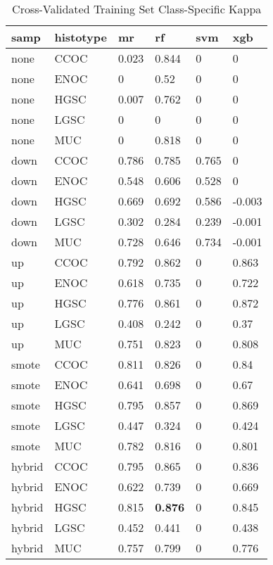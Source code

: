 \documentclass[
]{report}
\begin{document}
\begin{table}

\caption{\label{tab:train-kappa-class-table}Cross-Validated Training Set Class-Specific Kappa}
\centering
\begin{tabular}[t]{l|l|l|l|l|l}
\hline
samp & histotype & mr & rf & svm & xgb\\
\hline
none & CCOC & 0.023 & 0.844 & 0 & 0\\
\hline
none & ENOC & 0 & 0.52 & 0 & 0\\
\hline
none & HGSC & 0.007 & 0.762 & 0 & 0\\
\hline
none & LGSC & 0 & 0 & 0 & 0\\
\hline
none & MUC & 0 & 0.818 & 0 & 0\\
\hline
down & CCOC & 0.786 & 0.785 & 0.765 & 0\\
\hline
down & ENOC & 0.548 & 0.606 & 0.528 & 0\\
\hline
down & HGSC & 0.669 & 0.692 & 0.586 & -0.003\\
\hline
down & LGSC & 0.302 & 0.284 & 0.239 & -0.001\\
\hline
down & MUC & 0.728 & 0.646 & 0.734 & -0.001\\
\hline
up & CCOC & 0.792 & 0.862 & 0 & 0.863\\
\hline
up & ENOC & 0.618 & 0.735 & 0 & 0.722\\
\hline
up & HGSC & 0.776 & 0.861 & 0 & 0.872\\
\hline
up & LGSC & 0.408 & 0.242 & 0 & 0.37\\
\hline
up & MUC & 0.751 & 0.823 & 0 & 0.808\\
\hline
smote & CCOC & 0.811 & 0.826 & 0 & 0.84\\
\hline
smote & ENOC & 0.641 & 0.698 & 0 & 0.67\\
\hline
smote & HGSC & 0.795 & 0.857 & 0 & 0.869\\
\hline
smote & LGSC & 0.447 & 0.324 & 0 & 0.424\\
\hline
smote & MUC & 0.782 & 0.816 & 0 & 0.801\\
\hline
hybrid & CCOC & 0.795 & 0.865 & 0 & 0.836\\
\hline
hybrid & ENOC & 0.622 & 0.739 & 0 & 0.669\\
\hline
hybrid & HGSC & 0.815 & \textbf{0.876} & 0 & 0.845\\
\hline
hybrid & LGSC & 0.452 & 0.441 & 0 & 0.438\\
\hline
hybrid & MUC & 0.757 & 0.799 & 0 & 0.776\\
\hline
\end{tabular}
\end{table}
\end{document}
